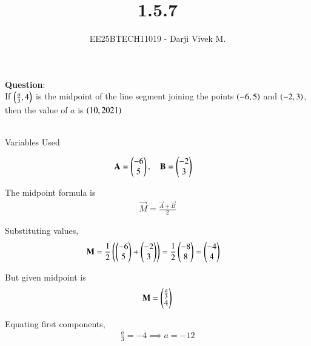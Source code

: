 \documentclass[journal]{IEEEtran}
\begin{document}


\title{1.5.7}
\author{EE25BTECH11019 - Darji Vivek M.}
{\let\newpage\relax\maketitle}

\renewcommand{\thefigure}{\theenumi}
\renewcommand{\thetable}{\theenumi}
\setlength{\intextsep}{10pt} %


\renewcommand{\thetable}{\theenumi}


\textbf{Question}:\\
If $\left(\frac{a}{3},4\right)$ is the midpoint of the line segment joining the points $\left(-6,5\right)$ and $\left(-2,3\right)$, then the value of $a$ is \hfill $\left(10,2021\right)$
\\
\solution \\
\begin{table}[h!]    
  \centering
  
  \caption{Variables Used}
  \label{tab10.5.7.1}
\end{table}

\begin{align}
\mathbf{A} &= \begin{pmatrix}-6\\5\end{pmatrix}, \quad 
\mathbf{B} = \begin{pmatrix}-2\\3\end{pmatrix}
\end{align}

The midpoint formula is
\begin{align}
\vec{M} = \frac{\vec{A}+\vec{B}}{2}
\end{align}

Substituting values,
\begin{align}
\mathbf{M} &= \frac{1}{2}\left(\begin{pmatrix}-6\\5\end{pmatrix}+\begin{pmatrix}-2\\3\end{pmatrix}\right)
= \frac{1}{2}\begin{pmatrix}-8\\8\end{pmatrix} 
= \begin{pmatrix}-4\\4\end{pmatrix}
\end{align}

But given midpoint is
\begin{align}
\mathbf{M} = \begin{pmatrix}\tfrac{a}{3}\\4\end{pmatrix}
\end{align}

Equating first components,
\begin{align}
\frac{a}{3} = -4 \implies a = -12
\end{align}
\end{document}
